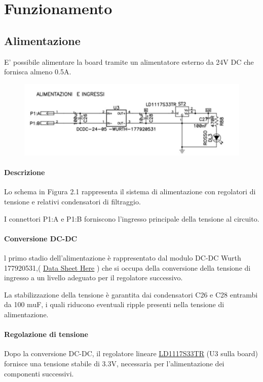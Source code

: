 \documentclass[12pt,a4paper]{report}
\begin{document}
\section{Funzionamento}
\subsection{Alimentazione}

E' possibile alimentare la board tramite un alimentatore esterno da 24V DC che fornisca almeno 0.5A.


\begin{figure}[H]
    \centering
    \includegraphics[width=\linewidth]{../image/psu.png}
    \caption{ }
\end{figure}

\paragraph{Descrizione } 
Lo schema in Figura 2.1 
rappresenta il sistema di alimentazione con regolatori di tensione e relativi condensatori di filtraggio. 

I connettori P1:A e P1:B forniscono l'ingresso principale della tensione al circuito.

\paragraph{Conversione DC-DC } 
l primo stadio dell'alimentazione è rappresentato dal modulo DC-DC Wurth 177920531,( \href{https://www.we-online.com/components/products/datasheet/1769205341.pdf}{Data Sheet Here} )
che si occupa della conversione della tensione di ingresso a un livello adeguato per il regolatore successivo. 

La stabilizzazione della tensione è garantita dai condensatori C26 e C28 entrambi da 100 
muF, 
i quali riducono eventuali ripple presenti nella tensione di alimentazione.

\paragraph{Regolazione di tensione}
Dopo la conversione DC-DC, il regolatore lineare 
\href{https://www.mouser.it/datasheet/2/389/ld1117-1849389.pdf}{LD1117S33TR} (U3 sulla board) fornisce una tensione stabile di 3.3V, 
necessaria per l'alimentazione dei componenti successivi. 
\end{document}
